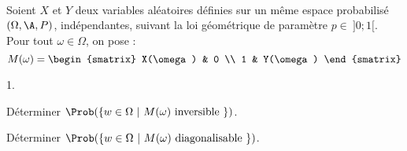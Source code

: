 \documentclass[11pt]{article}%
\begin{document}
\begin{exerciceSP}~\\
  Soient $X$ et $Y$ deux variables aléatoires définies sur un même
  espace probabilisé $(\Omega , \A , P)$, indépendantes, suivant la
  loi géométrique de paramètre $p \in \ ] 0 ; 1[$. \\
  Pour tout $\omega \in \Omega$, on pose :
  \[
  M(\omega) =
  \begin{smatrix} 
    X(\omega) & 0 \\ 
    1 & Y(\omega) 
  \end{smatrix}
  \] 
  \begin{noliste}{1.}
    \setlength{\itemsep}{2mm}
  \item Déterminer $\Prob( \{ w \in \Omega \ | \ M(\omega) \text{
      inversible } \} )$.
  \item Déterminer $\Prob( \{ w \in \Omega \ | \ M(\omega) \text{
      diagonalisable } \} )$.
  \end{noliste}
\end{exerciceSP}


\newpage
\end{document}
